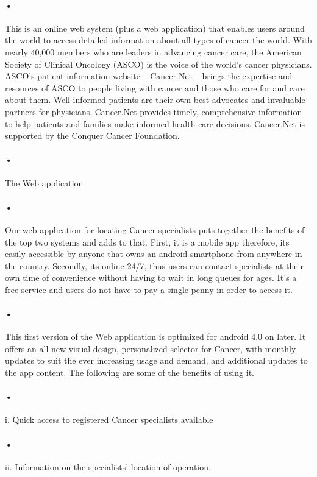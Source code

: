 \documentclass[12pt]{article}
\begin{document}
\paragraph{•}This is an online web system (plus a web application) that enables users around the world to access detailed information about all types of cancer the world. With nearly 40,000 members who are leaders in advancing cancer care, the American Society of Clinical Oncology (ASCO) is the voice of the world’s cancer physicians. ASCO’s patient information website -- Cancer.Net -- brings the expertise and resources of ASCO to people living with cancer and those who care for and care about them. Well-informed patients are their own best advocates and invaluable partners for physicians. Cancer.Net provides timely, comprehensive information to help patients and families make informed health care decisions. Cancer.Net is supported by the Conquer Cancer Foundation.

\paragraph{•}The Web application
\paragraph{•}Our web application for locating Cancer specialists puts together the benefits of the top two systems and adds to that. First, it is a mobile app therefore, its easily accessible by anyone that owns an android smartphone from anywhere in the country. Secondly, its online 24/7, thus users can contact specialists at their own time of convenience without having to wait in long queues for ages. It’s a free service and users do not have to pay a single penny in order to access it.
  
\paragraph{•}This first version of the Web application is optimized for android 4.0 on later. It offers an all-new visual design, personalized selector for Cancer, with monthly updates to suit the ever increasing usage and demand, and additional updates to the app content. The following are some of the benefits of using it.
\paragraph{•}i. Quick access to registered Cancer specialists available
\paragraph{•}ii. Information on the specialists’ location of operation.
\end{document}
